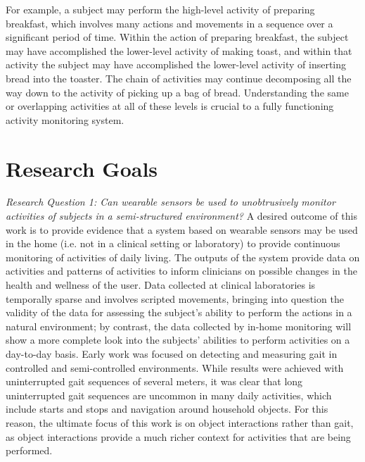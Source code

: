 \documentclass[12pt]{report}
\begin{document}
For example, a subject may perform the high-level activity of preparing breakfast, which involves many actions and movements in a sequence over a significant period of time. Within the action of preparing breakfast, the subject may have accomplished the lower-level activity of making toast, and within that activity the subject may have accomplished the lower-level activity of inserting bread into the toaster. The chain of activities may continue decomposing all the way down to the activity of picking up a bag of bread. Understanding the same or overlapping activities at all of these levels is crucial to a fully functioning activity monitoring system.


\section{Research Goals}
\emph{Research Question 1: Can wearable sensors be used to unobtrusively monitor activities of subjects in a semi-structured environment?}
A desired outcome of this work is to provide evidence that a system based on wearable sensors may be used in the home (i.e. not in a clinical setting or laboratory) to provide continuous monitoring of activities of daily living. The outputs of the system provide data on activities and patterns of activities to inform clinicians on possible changes in the health and wellness of the user. Data collected at clinical laboratories is temporally sparse and involves scripted movements, bringing into question the validity of the data for assessing the subject’s ability to perform the actions in a natural environment; by contrast, the data collected by in-home monitoring will show a more complete look into the subjects’ abilities to perform activities on a day-to-day basis.
Early work was focused on detecting and measuring gait in controlled and semi-controlled environments. While results were achieved with uninterrupted gait sequences of several meters, it was clear that long uninterrupted gait sequences are uncommon in many daily activities, which include starts and stops and navigation around household objects. For this reason, the ultimate focus of this work is on object interactions rather than gait, as object interactions provide a much richer context for activities that are being performed.
\end{document}

